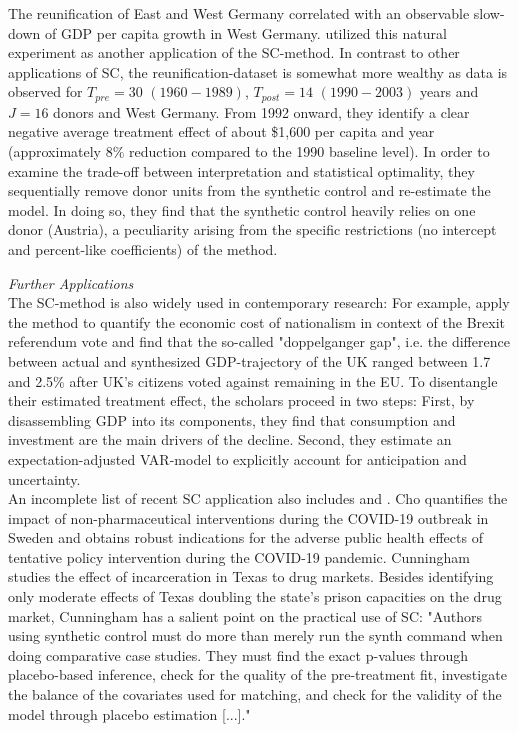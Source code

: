 The reunification of East and West Germany correlated with an observable slow-down of \ac{GDP} per capita growth in West Germany. \cite{abadie:2015} utilized this natural experiment as another application of the \ac{SC}-method. In contrast to other applications of \ac{SC}, the reunification-dataset is somewhat more wealthy as data is observed for $T_{pre} = 30$ $(1960-1989)$, $T_{post} = 14$ $(1990-2003)$ years and $J = 16$ donors and West Germany. From 1992 onward, they identify a clear negative average treatment effect of about \$1,600 per capita and year (approximately 8\% reduction compared to the 1990 baseline level). In order to examine the trade-off between interpretation and statistical optimality, they sequentially remove donor units from the synthetic control and re-estimate the model. In doing so, they find that the synthetic control heavily relies on one donor (Austria), a peculiarity arising from the specific restrictions (no intercept and percent-like coefficients) of the method.

\textit{Further Applications}\\
The \ac{SC}-method is also widely used in contemporary research: For example, \cite{born:2019} apply the method to quantify the economic cost of nationalism in context of the Brexit referendum vote and find that the so-called "doppelganger gap", i.e. the difference between actual and synthesized \ac{GDP}-trajectory of the \ac{UK} ranged between 1.7 and 2.5\% after \ac{UK}'s citizens voted against remaining in the EU. To disentangle their estimated treatment effect, the scholars proceed in two steps: First, by disassembling \ac{GDP} into its components, they find that consumption and investment are the main drivers of the decline. Second, they estimate an expectation-adjusted \ac{VAR}-model to explicitly account for anticipation and uncertainty. \\
An incomplete list of recent \ac{SC} application also includes \cite{cho:2020} and  \cite{cunningham:2021}. Cho quantifies the impact of non-pharmaceutical interventions during the COVID-19 outbreak in Sweden and obtains robust indications for the adverse public health effects of tentative policy intervention during the COVID-19 pandemic. Cunningham studies the effect of incarceration in Texas to drug markets. Besides identifying only moderate effects of Texas doubling the state's prison capacities on the drug market, Cunningham has a salient point on the practical use of \ac{SC}: "Authors using synthetic control must do more than merely run the synth command when doing comparative case studies. They must find the exact p-values through placebo-based inference, check for the quality of the pre-treatment fit, investigate the balance of the covariates used for matching, and check for the validity of the model through placebo estimation [...]."


